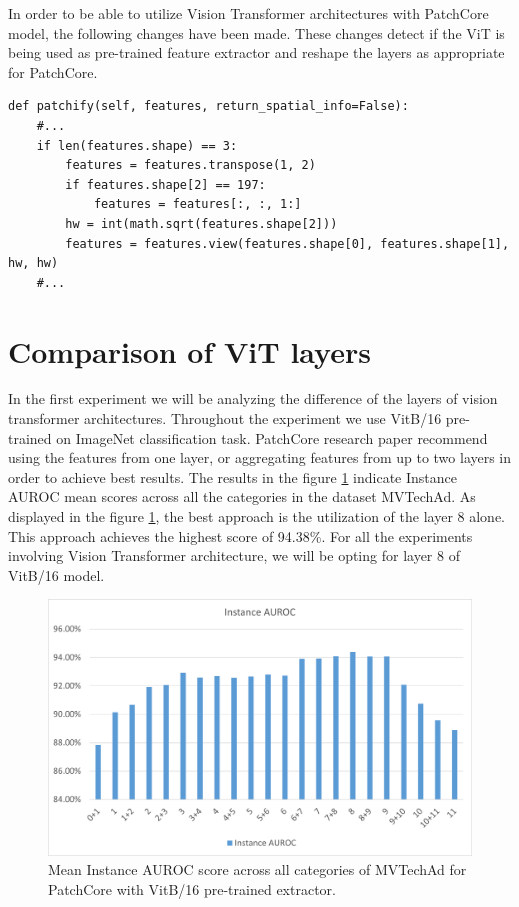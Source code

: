 In order to be able to utilize Vision Transformer architectures with PatchCore model, the following changes have been made. These changes detect if the ViT is being used as pre-trained feature extractor and reshape the layers as appropriate for PatchCore.

\begin{lstlisting}
def patchify(self, features, return_spatial_info=False):
	#...
	if len(features.shape) == 3:
		features = features.transpose(1, 2)
		if features.shape[2] == 197:
			features = features[:, :, 1:]
		hw = int(math.sqrt(features.shape[2]))
		features = features.view(features.shape[0], features.shape[1], hw, hw)
	#...
\end{lstlisting}

\section{Comparison of ViT layers}
\label{vit layers}

In the first experiment we will be analyzing the difference of the layers of vision transformer architectures. Throughout the experiment we use VitB/16 pre-trained on ImageNet classification task. PatchCore research paper recommend using the features from one layer, or aggregating features from up to two layers in order to achieve best results. The results in the figure \ref{fig:vit_layers} indicate Instance AUROC mean scores across all the categories in the dataset MVTechAd. As displayed in the figure \ref{fig:vit_layers}, the best approach is the utilization of the layer 8 alone. This approach achieves the highest score of 94.38\%. For all the experiments involving Vision Transformer architecture, we will be opting for layer 8 of VitB/16 model.

\begin{figure}[t]
	\begin{center}
		\includegraphics[width=1.0\linewidth]{Chapter_4/vit.png}
	\end{center}
	\caption{Mean Instance AUROC score across all categories of MVTechAd for PatchCore with VitB/16 pre-trained extractor.}
	\label{fig:vit_layers}
\end{figure}

